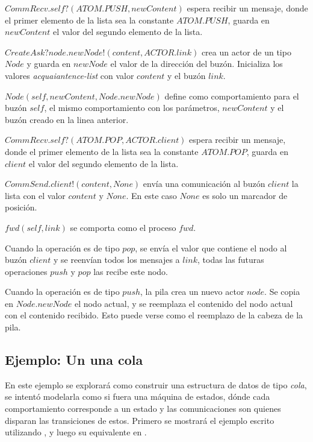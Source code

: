 \begin{description}
 \item $CommRecv.self?(ATOM.PUSH, newContent)$ espera recibir un mensaje, donde el primer elemento de la lista sea la constante $ATOM.PUSH$, guarda en $newContent$ el valor del segundo elemento de la lista.
 \item $CreateAsk?node.newNode!(content, ACTOR.link)$ crea un actor de un tipo $Node$ y guarda en $newNode$ el valor de la dirección del buzón. Inicializa los valores \textit{acquaiantence-list} con valor $content$ y el buzón $link$.
 \item $Node(self, newContent, Node.newNode)$ define como comportamiento para el buzón $self$, el mismo comportamiento con los parámetros, $newContent$ y el buzón creado en la linea anterior.
 \item $CommRecv.self?(ATOM.POP, ACTOR.client)$ espera recibir un mensaje, donde el primer elemento de la lista sea la constante $ATOM.POP$, guarda en $client$ el valor del segundo elemento de la lista.
 \item $CommSend.client!(content, None)$ envía una comunicación al buzón $client$ la lista con el valor $content$ y $None$. En este caso $None$ es solo un marcador de posición.
 \item $fwd(self, link)$ se comporta como el proceso $fwd$. 
\end{description}

Cuando la operación es de tipo $pop$, se envía el valor que contiene el nodo al buzón $client$ y se reenvían todos los mensajes a $link$, todas las futuras operaciones $push$ y $pop$ las recibe este nodo.

Cuando la operación es de tipo $push$, la pila crea un nuevo actor $node$. Se copia en $Node.newNode$ el nodo actual, y se reemplaza el contenido del nodo actual con el contenido recibido. Esto puede verse como el reemplazo de la cabeza de la pila.

\subsection{Ejemplo: Un una cola}

En este ejemplo se explorará como construir una estructura de datos de tipo \textit{cola}, se intentó modelarla como si fuera una máquina de estados, dónde cada comportamiento corresponde a un estado y las comunicaciones son quienes disparan las transiciones de estos. Primero se mostrará el ejemplo escrito utilizando \SAL, y luego su equivalente en \CSPm.

